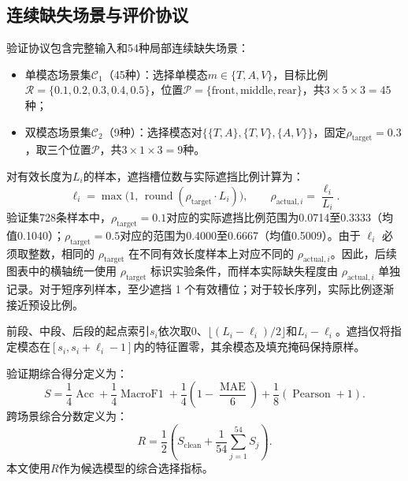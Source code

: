\documentclass[UTF8,a4paper,11pt]{ctexart}
\begin{document}
\subsection{连续缺失场景与评价协议}\label{subsec:q2_benchmark}
验证协议包含完整输入和54种局部连续缺失场景：
\begin{itemize}[leftmargin=2.5em,itemsep=0pt,topsep=2pt]
  \item 单模态场景集$\mathcal C_1$（45种）：选择单模态$m \in \{T, A, V\}$，目标比例$\mathcal R = \{0.1, 0.2, 0.3, 0.4, 0.5\}$，位置$\mathcal P = \{\mathrm{front}, \mathrm{middle}, \mathrm{rear}\}$，共$3 \times 5 \times 3 = 45$种；
  \item 双模态场景集$\mathcal C_2$（9种）：选择模态对$\{\{T, A\}, \{T, V\}, \{A, V\}\}$，固定$\rho_{\mathrm{target}} = 0.3$，取三个位置$\mathcal P$，共$3 \times 1 \times 3 = 9$种。
\end{itemize}

对有效长度为$L_i$的样本，遮挡槽位数与实际遮挡比例计算为：
\begin{equation}
\ell_i = \max\big(1,\, \operatorname{round}(\rho_{\mathrm{target}} \cdot L_i)\big),\qquad
\rho_{\mathrm{actual}, i} = \frac{\ell_i}{L_i}.
\label{eq:q2_mask_len}
\end{equation}
验证集728条样本中，$\rho_{\mathrm{target}} = 0.1$对应的实际遮挡比例范围为0.0714至0.3333（均值0.1040）；$\rho_{\mathrm{target}} = 0.5$对应的范围为0.4000至0.6667（均值0.5009）。由于 $\ell_i$ 必须取整数，相同的 $\rho_{\mathrm{target}}$ 在不同有效长度样本上对应不同的 $\rho_{\mathrm{actual},i}$。因此，后续图表中的横轴统一使用 $\rho_{\mathrm{target}}$ 标识实验条件，而样本实际缺失程度由 $\rho_{\mathrm{actual},i}$ 单独记录。对于短序列样本，至少遮挡 1 个有效槽位；对于较长序列，实际比例逐渐接近预设比例。

前段、中段、后段的起点索引$s_i$依次取$0$、$\lfloor (L_i - \ell_i)/2 \rfloor$和$L_i - \ell_i$。遮挡仅将指定模态在$[s_i, s_i + \ell_i - 1]$内的特征置零，其余模态及填充掩码保持原样。

验证期综合得分定义为：
\begin{equation}
S = \frac{1}{4}\operatorname{Acc} + \frac{1}{4}\operatorname{MacroF1} + \frac{1}{4}\left(1 - \frac{\operatorname{MAE}}{6}\right) + \frac{1}{8}(\operatorname{Pearson} + 1).
\label{eq:q2_score_s}
\end{equation}
跨场景综合分数定义为：
\begin{equation}
R = \frac{1}{2}\left(S_{\mathrm{clean}} + \frac{1}{54}\sum_{j=1}^{54} S_j\right).
\label{eq:q2_robust_r}
\end{equation}
本文使用$R$作为候选模型的综合选择指标。
\end{document}
